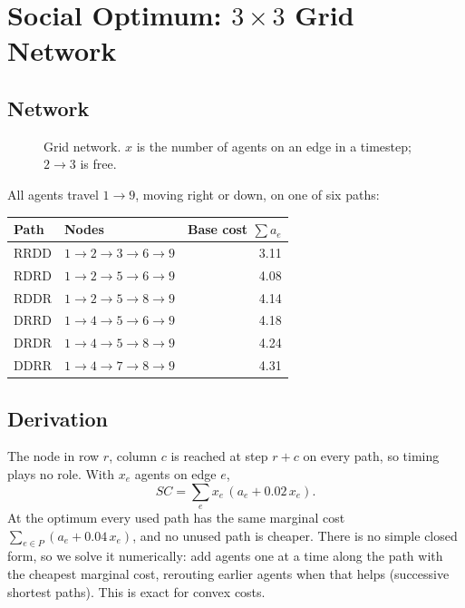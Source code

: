 \documentclass[11pt]{article}
\begin{document}
\section{Social Optimum: $3 \times 3$ Grid Network}

\subsection{Network}

\begin{figure}[H]
  \centering
  
  \caption{Grid network. $x$ is the number of agents on an edge in a timestep; $2 \to 3$ is free.}
\end{figure}

All agents travel $1 \to 9$, moving right or down, on one of six paths:

\begin{center}
\begin{tabular}{@{}llr@{}}
\toprule
Path & Nodes & Base cost $\sum a_e$ \\
\midrule
RRDD & $1 \to 2 \to 3 \to 6 \to 9$ & 3.11 \\
RDRD & $1 \to 2 \to 5 \to 6 \to 9$ & 4.08 \\
RDDR & $1 \to 2 \to 5 \to 8 \to 9$ & 4.14 \\
DRRD & $1 \to 4 \to 5 \to 6 \to 9$ & 4.18 \\
DRDR & $1 \to 4 \to 5 \to 8 \to 9$ & 4.24 \\
DDRR & $1 \to 4 \to 7 \to 8 \to 9$ & 4.31 \\
\bottomrule
\end{tabular}
\end{center}

\subsection{Derivation}

The node in row $r$, column $c$ is reached at step $r + c$ on every path, so timing plays no role. With
$x_e$ agents on edge $e$,
\[
  SC = \sum_e x_e\,(a_e + 0.02\,x_e).
\]
At the optimum every used path has the same marginal cost $\sum_{e \in P}(a_e + 0.04\,x_e)$, and no unused
path is cheaper. There is no simple closed form, so we solve it numerically: add agents one at a time
along the path with the cheapest marginal cost, rerouting earlier agents when that helps (successive
shortest paths). This is exact for convex costs.
\end{document}
